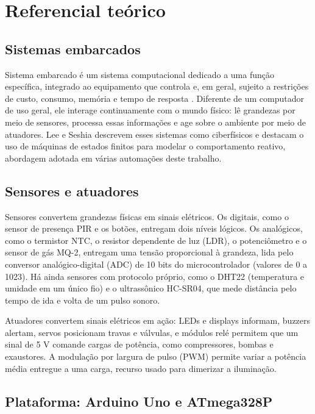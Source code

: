 \documentclass[12pt]{article}
\begin{document}
\section{Referencial teórico}\label{sec:referencial}

\subsection{Sistemas embarcados}

Sistema embarcado é um sistema computacional dedicado a uma função específica, integrado ao equipamento que controla e, em geral, sujeito a restrições de custo, consumo, memória e tempo de resposta \cite{marwedel2021,wolf2017}. Diferente de um computador de uso geral, ele interage continuamente com o mundo físico: lê grandezas por meio de sensores, processa essas informações e age sobre o ambiente por meio de atuadores. Lee e Seshia \cite{lee2017} descrevem esses sistemas como ciberfísicos e destacam o uso de máquinas de estados finitos para modelar o comportamento reativo, abordagem adotada em várias automações deste trabalho.

\subsection{Sensores e atuadores}

Sensores convertem grandezas físicas em sinais elétricos. Os digitais, como o sensor de presença PIR e os botões, entregam dois níveis lógicos. Os analógicos, como o termistor NTC, o resistor dependente de luz (LDR), o potenciômetro e o sensor de gás MQ-2, entregam uma tensão proporcional à grandeza, lida pelo conversor analógico-digital (ADC) de 10 bits do microcontrolador (valores de 0 a 1023). Há ainda sensores com protocolo próprio, como o DHT22 (temperatura e umidade em um único fio) e o ultrassônico HC-SR04, que mede distância pelo tempo de ida e volta de um pulso sonoro.

Atuadores convertem sinais elétricos em ação: LEDs e displays informam, buzzers alertam, servos posicionam travas e válvulas, e módulos relé permitem que um sinal de 5 V comande cargas de potência, como compressores, bombas e exaustores. A modulação por largura de pulso (PWM) permite variar a potência média entregue a uma carga, recurso usado para dimerizar a iluminação.

\subsection{Plataforma: Arduino Uno e ATmega328P}
\end{document}
